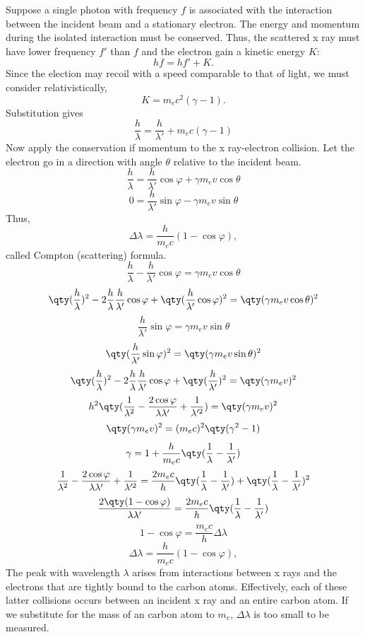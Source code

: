 \documentclass[a4paper,12pt]{article}
\begin{document}
Suppose a single photon with frequency $f$ is associated with the interaction between the incident beam and a stationary electron. The energy and momentum during the isolated interaction must be conserved. Thus, the scattered x ray must have lower frequency $f'$ than $f$ and the electron gain a kinetic energy $K$:
\[hf=hf'+K.\]
Since the election may recoil with a speed comparable to that of light, we must consider relativistically,
\[K=m_ec^2(\gamma-1).\]
Substitution gives
\[\frac{h}{\lambda}=\frac{h}{\lambda'}+m_ec(\gamma-1)\]
Now apply the conservation if momentum to the x ray-electron collision. Let the electron go in a direction with angle $\theta$ relative to the incident beam.
\[\frac{h}{\lambda}=\frac{h}{\lambda'}\cos\varphi+\gamma m_ev\cos\theta\]
\[0=\frac{h}{\lambda'}\sin\varphi-\gamma m_ev\sin\theta\]
Thus,
\[\Delta\lambda=\frac{h}{m_ec}(1-\cos\varphi),\]
called Compton (scattering) formula.
\bpr
\[\frac{h}{\lambda} - \frac{h}{\lambda'} \cos\varphi = \gamma m_e v \cos\theta\]
\[\qty(\frac{h}{\lambda})^2 - 2\frac{h}{\lambda} \frac{h}{\lambda'} \cos\varphi+ \qty(\frac{h}{\lambda'} \cos\varphi)^2= \qty(\gamma m_e v \cos\theta)^2\]
\[\frac{h}{\lambda'} \sin\varphi = \gamma m_e v \sin\theta\]
\[\qty(\frac{h}{\lambda'} \sin\varphi )^2=\qty( \gamma m_e v \sin\theta)^2\]
\[\qty(\frac{h}{\lambda})^2 - 2\frac{h}{\lambda} \frac{h}{\lambda'} \cos\varphi+ \qty(\frac{h}{\lambda'})^2= \qty(\gamma m_e v)^2\]
\[h^2\qty(\frac{1}{\lambda^2} - \frac{2\cos\varphi}{\lambda\lambda'} + \frac{1}{\lambda'^2})=\qty(\gamma m_e v)^2\]
\[\qty(\gamma m_e v)^2=(m_ec)^2\qty(\gamma^2-1)\]
\[\gamma = 1 + \frac{h}{m_e c} \qty( \frac{1}{\lambda} - \frac{1}{\lambda'})\]
\[\frac{1}{\lambda^2} - \frac{2\cos\varphi}{\lambda\lambda'} + \frac{1}{\lambda'^2}=\frac{2m_ec}{h}\qty( \frac{1}{\lambda} - \frac{1}{\lambda'})+\qty( \frac{1}{\lambda} - \frac{1}{\lambda'})^2\]
\[\frac{2\qty(1-\cos\varphi)}{\lambda\lambda'}=\frac{2m_ec}{h}\qty( \frac{1}{\lambda} - \frac{1}{\lambda'})\]
\[1-\cos\varphi=\frac{m_ec}{h}\Delta\lambda\]
\[\Delta\lambda=\frac{h}{m_ec}(1-\cos\varphi),\]
\epr
The peak with wavelength $\lambda$ arises from interactions between x rays and the electrons that are tightly bound to the carbon atoms. Effectively, each of these latter collisions occurs between an incident x ray and an entire carbon atom. If we substitute for the mass of an carbon atom to $m_e$, $\Delta\lambda$ is too small to be measured.
\end{document}
